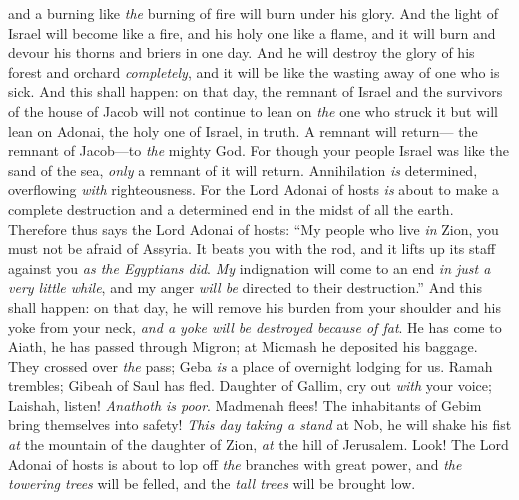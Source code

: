 \begin{biblechapter}
and a burning like \textit{the} burning of fire will burn under his glory.
\verse And the light of Israel will become like a fire, 
and his holy one like a flame, 
and it will burn and devour his thorns and briers in one day.
\verse And he will destroy the glory of his forest and orchard \textit{completely}, 
and it will be like the wasting away of one who is sick.
 And this shall happen: on that day, the remnant of Israel and the survivors of the house of Jacob will not continue to lean on \textit{the} one who struck it 
but will lean on Adonai, the holy one of Israel, in truth.
\verse A remnant will return— 
the remnant of Jacob—to \textit{the} mighty God.
\verse For though your people Israel was like the sand of the sea, 
\textit{only} a remnant of it will return. 
Annihilation \textit{is} determined, 
overflowing \textit{with} righteousness.
\verse For the Lord Adonai of hosts \textit{is} about to make a complete destruction 
and a determined end in the midst of all the earth.
\verse Therefore thus says the Lord Adonai of hosts:
\verse “My people who live \textit{in} Zion, 
you must not be afraid of Assyria. 
It beats you with the rod, 
and it lifts up its staff against you \textit{as the Egyptians did}.
\verse \textit{My} indignation will come to an end \textit{in just a very little while}, 
and my anger \textit{will be} directed to their destruction.”
\verse And this shall happen: on that day,
\verse he will remove his burden from your shoulder 
and his yoke from your neck, 
\textit{and a yoke will be destroyed because of fat}.
\verse He has come to Aiath, 
he has passed through Migron; 
at Micmash he deposited his baggage.
\verse They crossed over \textit{the} pass; 
Geba \textit{is} a place of overnight lodging for us. 
Ramah trembles; 
Gibeah of Saul has fled.
\verse Daughter of Gallim, cry out \textit{with} your voice; 
Laishah, listen! 
\textit{Anathoth is poor}.
\verse Madmenah flees! 
The inhabitants of Gebim bring themselves into safety!
\verse \textit{This day} \textit{taking a stand} at Nob, 
he will shake his fist \textit{at} the mountain of the daughter of Zion, 
\textit{at} the hill of Jerusalem.
\verse Look! The Lord Adonai of hosts is about to lop off \textit{the} branches with great power, 
and \textit{the towering trees} will be felled, 
and the \textit{tall trees} will be brought low.
\end{biblechapter}


